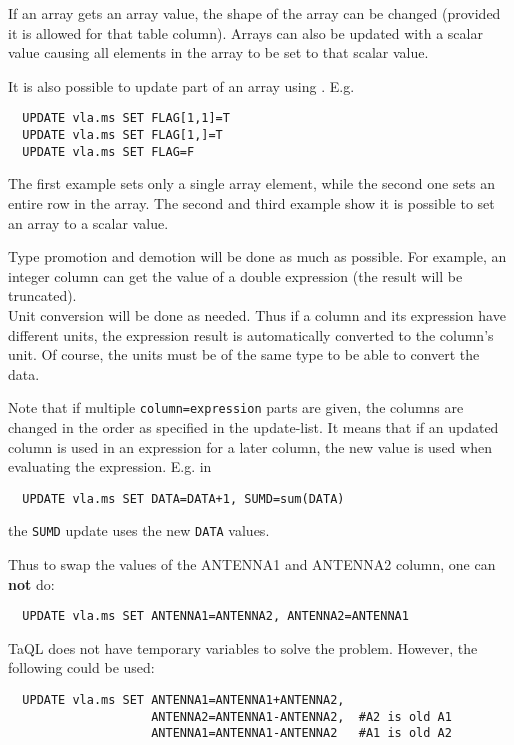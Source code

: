 If an array gets an array value, the shape of the array can be
changed (provided it is allowed for that table column).
Arrays can also be updated with a scalar value causing all elements
in the array to be set to that scalar value.

It is also possible to update part of an array using
. E.g.
\begin{verbatim}
  UPDATE vla.ms SET FLAG[1,1]=T
  UPDATE vla.ms SET FLAG[1,]=T
  UPDATE vla.ms SET FLAG=F
\end{verbatim}
The first example sets only a single array element, while the second
one sets an entire row in the array. The second and third example
show it is possible to set an array to a scalar value.

Type promotion and demotion will be done as much as possible.
For example, an integer column can get the value of a double
expression (the result will be truncated).
\\Unit conversion will be done as needed. Thus if a column and
its expression have different units, the expression result is automatically
converted to the column's unit. Of course, the units must be of the
same type to be able to convert the data.

Note that if multiple \texttt{column=expression} parts are given,
the columns are changed in the order as specified in the update-list.
It means that if an updated column is used in an expression for
a later column, the new value is used when evaluating the
expression. E.g. in
\begin{verbatim}
  UPDATE vla.ms SET DATA=DATA+1, SUMD=sum(DATA)
\end{verbatim}
the \texttt{SUMD} update uses the new \texttt{DATA} values.

Thus to swap the values of the ANTENNA1 and ANTENNA2 column, one
can {\bf not} do:
\begin{verbatim}
  UPDATE vla.ms SET ANTENNA1=ANTENNA2, ANTENNA2=ANTENNA1
\end{verbatim}
TaQL does not have temporary variables to solve the problem. However, the
following could be used:
\begin{verbatim}
  UPDATE vla.ms SET ANTENNA1=ANTENNA1+ANTENNA2,
                    ANTENNA2=ANTENNA1-ANTENNA2,  #A2 is old A1
                    ANTENNA1=ANTENNA1-ANTENNA2   #A1 is old A2
\end{verbatim}
    

